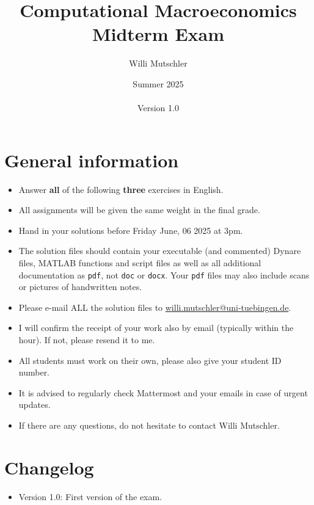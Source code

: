 \documentclass[a4paper]{scrartcl}
\begin{document}
	
\title{Computational Macroeconomics\\Midterm Exam}
\author{Willi Mutschler}
\date{Summer 2025\\~\\Version 1.0}
\maketitle

\section*{General information}

\begin{itemize}
\item
Answer \textbf{all} of the following \textbf{three} exercises in English.
\item
All assignments will be given the same weight in the final grade.
\item
Hand in your solutions before Friday June, 06 2025 at 3pm.
\item
The solution files should contain your executable (and commented) Dynare files, MATLAB functions and script files
  as well as all additional documentation as \texttt{pdf}, not \texttt{doc} or \texttt{docx}.
Your \texttt{pdf} files may also include scans or pictures of handwritten notes.
\item
Please e-mail ALL the solution files to \url{willi.mutschler@uni-tuebingen.de}.
\item
I will confirm the receipt of your work also by email (typically within the hour). If not, please resend it to me.
\item
All students must work on their own, please also give your student ID number.
\item
It is advised to regularly check Mattermost and your emails in case of urgent updates.
\item
If there are any questions, do not hesitate to contact Willi Mutschler.
\end{itemize}

\section*{Changelog}
\begin{itemize}
\item Version 1.0: First version of the exam.
\end{itemize}

\newpage
\end{document}
